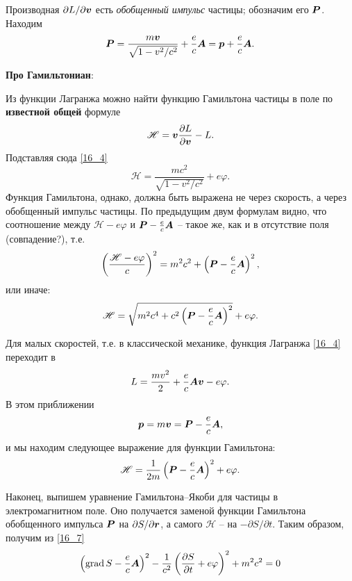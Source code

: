 Производная $\partial L / \partial \mbox{\boldmath $v$}$ есть \textit{обобщенный импульс} частицы; обозначим его $\mbox{\boldmath $P$}$. Находим
\begin{equation}
\label{16_5}
    \mbox{\boldmath $P$} = \frac{
    m \mbox{\boldmath $v$}
    }{
    \sqrt{1 - v^2 / c^2}
    } + \frac{e}{c} \mbox{\boldmath $A$} = \mbox{\boldmath $p$} + \frac{e}{c} \mbox{\boldmath $A$}.
\end{equation}


\noindent
\textbf{Про Гамильтониан}:

\phantom{42}

Из функции Лагранжа можно найти функцию Гамильтона частицы в поле по \textbf{известной общей} формуле 
\begin{equation}
    \mathscr{H} = \mbox{\boldmath $v$} \frac{\partial L}{\partial \mbox{\boldmath $v$}} - L.
\end{equation}
Подставляя сюда \eqref{16_4}
\begin{equation}
    \mathscr{H} = \frac{mc^2}{\sqrt{1 - v^2/c^2}} + e \varphi.
\end{equation}
Функция Гамильтона, однако, должна быть выражена не через скорость, а через обобщенный импульс частицы. По предыдущим двум формулам видно, что соотношение между $\mathscr{H}  - e\varphi$ и $\mbox{\boldmath $P$} - \frac{e}{c} \mbox{\boldmath $A$}$ -- такое же, как и в отсутствие поля (совпадение?), т.е.
\begin{equation}
\label{16_7}
    \left(\frac{\mathscr{H} - e\varphi}{c} \right)^2 = m^2c^2 + \left(\mbox{\boldmath $P$} - \frac{e}{c} \mbox{\boldmath $A$}\right)^2,
\end{equation}
или иначе:
\begin{equation}
    \mathscr{H}  = \sqrt{ m^2 c^4 + c^2 \left(\mbox{\boldmath $P$} - \frac{e}{c} \mbox{\boldmath $A$} \right)^2} + e\varphi.
\end{equation}

Для малых скоростей, т.е. в классической механике, функция Лагранжа \eqref{16_4} переходит в 
\begin{equation}
    L = \frac{mv^2}{2}  + \frac{e}{c} \mbox{\boldmath $A$} \mbox{\boldmath $v$} - e \varphi.
\end{equation}
В этом приближении
$$
    \mbox{\boldmath $p$} = m \mbox{\boldmath $v$} = \mbox{\boldmath $P$} - \frac{e}{c} \mbox{\boldmath $A$},
$$
и мы находим следующее выражение для функции Гамильтона:
\begin{equation}
    \mathscr{H} = \frac{1}{2m} \left(\mbox{\boldmath $P$} - \frac{e}{c} \mbox{\boldmath $A$}\right)^2 + e \varphi.
\end{equation}

Наконец, выпишем уравнение Гамильтона--Якоби для частицы в электромагнитном поле. Оно получается заменой функции Гамильтона обобщенного импульса $\mbox{\boldmath $P$}$ на $\partial S / \partial \mbox{\boldmath $r$}$, а самого $\mathscr{H}$ -- на $-\partial S/\partial t$. Таким образом, получим из \eqref{16_7} 
\begin{equation}
    \left(
        \text{grad} \, S - \frac{e}{c} \mbox{\boldmath $A$}
    \right)^2 - \frac{1}{c^2} \left(\frac{\partial S}{\partial t} + e \varphi \right)^2 + m^2 c^2 = 0 
\end{equation}







